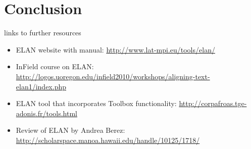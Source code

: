 \documentclass{beamer}
\begin{document}
    
  \section{Conclusion} 
    \begin{frame}{links to further resources}
      \begin{itemize}
        \item ELAN website with manual: \url{http://www.lat-mpi.eu/tools/elan/}
        \item InField course on ELAN: \url{http://logos.uoregon.edu/infield2010/workshops/aligning-text-elan1/index.php}
        \item ELAN tool that incorporates Toolbox functionality: \url{http://corpafroas.tge-adonis.fr/tools.html}
        \item Review of ELAN by Andrea Berez: \url{http://scholarspace.manoa.hawaii.edu/handle/10125/1718/}
      \end{itemize}
    \end{frame}
    
\end{document}
